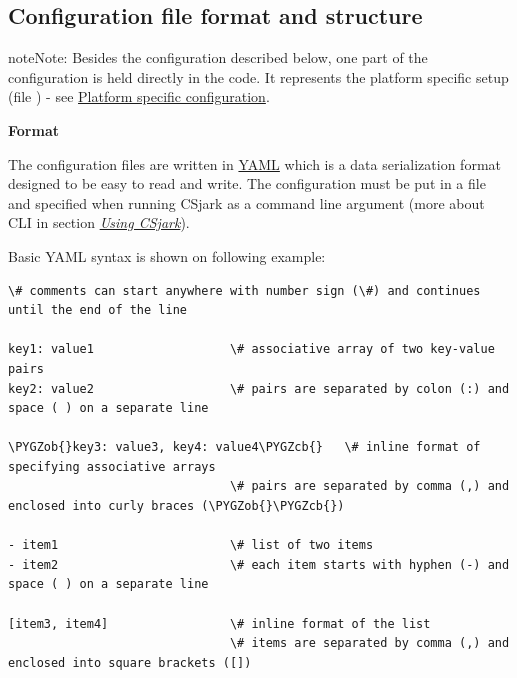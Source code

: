 \documentclass[A4paper,10pt,english]{sphinxmanual}
\def\PYGZob{\char`\{}
\def\PYGZcb{\char`\}}
\begin{document}
\begin{center}\setlength{\fboxsep}{5pt}\end{center}


\subsection{Configuration file format and structure}
\label{user/config:configuration-file-format-and-structure}\label{user/config:configfile}
\begin{notice}{note}{Note:}
Besides the configuration described below, one part of the configuration is held directly in the code. It represents the platform specific setup (file ) - see {\hyperref[user/config:platform-specific-configuration]{Platform specific configuration}}.
\end{notice}

\textbf{Format}

The configuration files are written in \href{http://www.yaml.org/}{YAML} which is a data serialization format designed to be easy to read and write. The configuration must be put in a  file and specified when running CSjark as a command line argument (more about CLI in section {\hyperref[user/use:use]{\emph{Using CSjark}}}).

Basic YAML syntax is shown on following example:

\begin{Verbatim}[commandchars=\\\{\}]
\# comments can start anywhere with number sign (\#) and continues until the end of the line

key1: value1                   \# associative array of two key-value pairs
key2: value2                   \# pairs are separated by colon (:) and space ( ) on a separate line

\PYGZob{}key3: value3, key4: value4\PYGZcb{}   \# inline format of specifying associative arrays
                               \# pairs are separated by comma (,) and enclosed into curly braces (\PYGZob{}\PYGZcb{})

- item1                        \# list of two items
- item2                        \# each item starts with hyphen (-) and space ( ) on a separate line

[item3, item4]                 \# inline format of the list
                               \# items are separated by comma (,) and enclosed into square brackets ([])
\end{Verbatim}
\end{document}
